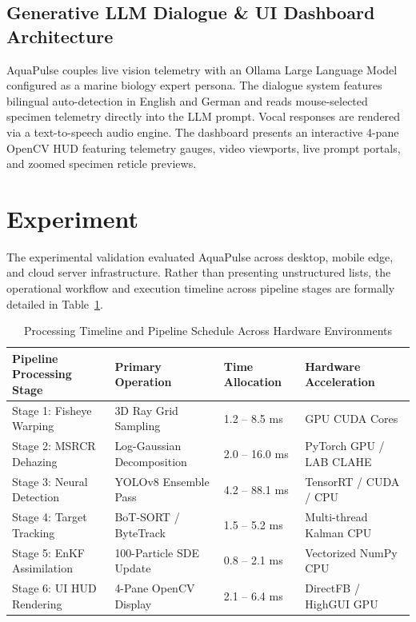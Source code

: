 \documentclass[11pt,a4paper]{article}
\newcommand{\citeblue}[1]{{\color{linkblue}\cite{#1}}}
\newcommand{\refblue}[1]{{\color{linkblue}\ref{#1}}}
\begin{document}
\subsection{Generative LLM Dialogue \& UI Dashboard Architecture}
AquaPulse couples live vision telemetry with an Ollama Large Language Model \citeblue{touvron2023llama, dubey2024llama3} configured as a marine biology expert persona. The dialogue system features bilingual auto-detection in English and German and reads mouse-selected specimen telemetry directly into the LLM prompt. Vocal responses are rendered via a text-to-speech audio engine. The dashboard presents an interactive 4-pane OpenCV HUD featuring telemetry gauges, video viewports, live prompt portals, and zoomed specimen reticle previews.

\section{Experiment}
The experimental validation evaluated AquaPulse across desktop, mobile edge, and cloud server infrastructure. Rather than presenting unstructured lists, the operational workflow and execution timeline across pipeline stages are formally detailed in Table~\refblue{tab:experiment_timeline}.

\begin{table}[htbp]
\caption{Processing Timeline and Pipeline Schedule Across Hardware Environments}
\label{tab:experiment_timeline}
\centering
\small
\begin{tabular}{p{3.8cm} p{3.2cm} p{3.0cm} p{4.2cm}}
\toprule
\textbf{Pipeline Processing Stage} & \textbf{Primary Operation} & \textbf{Time Allocation} & \textbf{Hardware Acceleration} \\
\midrule
Stage 1: Fisheye Warping & 3D Ray Grid Sampling & 1.2 -- 8.5 ms & GPU CUDA Cores \\
Stage 2: MSRCR Dehazing & Log-Gaussian Decomposition & 2.0 -- 16.0 ms & PyTorch GPU / LAB CLAHE \\
Stage 3: Neural Detection & YOLOv8 Ensemble Pass & 4.2 -- 88.1 ms & TensorRT / CUDA / CPU \\
Stage 4: Target Tracking & BoT-SORT / ByteTrack & 1.5 -- 5.2 ms & Multi-thread Kalman CPU \\
Stage 5: EnKF Assimilation & 100-Particle SDE Update & 0.8 -- 2.1 ms & Vectorized NumPy CPU \\
Stage 6: UI HUD Rendering & 4-Pane OpenCV Display & 2.1 -- 6.4 ms & DirectFB / HighGUI GPU \\
\bottomrule
\end{tabular}
\end{table}
\end{document}
